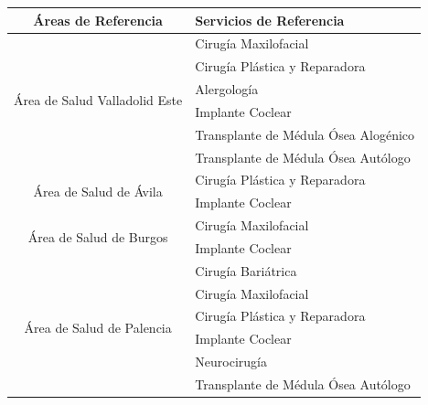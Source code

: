 \begin{table}
    \centering
    \begin{tabular}{cl}
        \toprule
        Áreas de Referencia                                      & Servicios de Referencia              \\
        \midrule
        \multirow{6}{*}{Área de Salud   Valladolid Este}         & Cirugía Maxilofacial                 \\
                                                                 & Cirugía Plástica y Reparadora        \\
                                                                 & Alergología                          \\
                                                                 & Implante Coclear                     \\
                                                                 & Transplante de Médula Ósea Alogénico \\
                                                                 & Transplante de Médula Ósea Autólogo  \\
        \midrule
        \multirow{2}{*}{Área de Salud de   Ávila}                & Cirugía Plástica y Reparadora        \\
                                                                 & Implante Coclear                     \\
        \midrule
        \multirow{2}{*}{Área de Salud de   Burgos}               & Cirugía Maxilofacial                 \\
                                                                 & Implante Coclear                     \\
        \midrule
        \multirow{6}{*}{Área de Salud de   Palencia}             & Cirugía Bariátrica                   \\
                                                                 & Cirugía Maxilofacial                 \\
                                                                 & Cirugía Plástica y Reparadora        \\
                                                                 & Implante Coclear                     \\
                                                                 & Neurocirugía                         \\
                                                                 & Transplante de Médula Ósea Autólogo  \\

\end{tabular}
\end{table}
